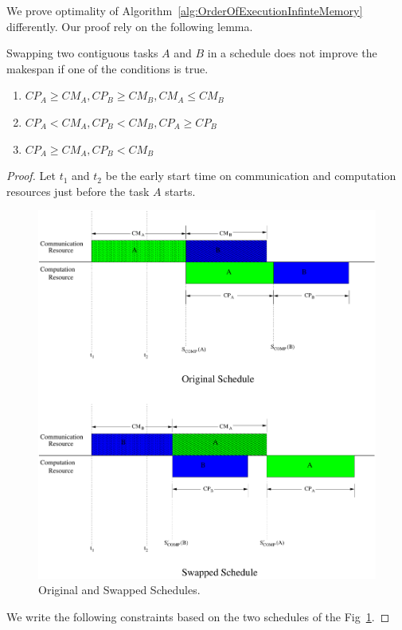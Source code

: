 \documentclass[runningheads]{llncs} %
\begin{document}
We  prove optimality of Algorithm~\ref{alg:OrderOfExecutionInfinteMemory}  differently. Our proof rely on the following lemma.

\begin{lemma}\label{lemma:swappingOfTasks}
	Swapping two contiguous tasks $A$ and $B$ in a schedule does not improve the makespan if one of the conditions is true.
	\begin{enumerate}[label=\roman*)]
		\item  $CP_A \ge CM_A, CP_B \ge CM_B, CM_A \le CM_B$
		\item $CP_A < CM_A, CP_B < CM_B, CP_A \ge CP_B$
		\item $CP_A \ge CM_A, CP_B < CM_B$
	\end{enumerate}
\end{lemma}
\begin{proof}
	Let $t_1$ and $t_2$ be the early start time on communication and computation resources just before the task $A$ starts.
	
	\begin{figure}[htb]
		\centering
		\includegraphics[scale=0.35]{./original_swapped_schedules-eps-converted-to.pdf}
		\caption{ \label{fig:bothSchedule} Original and Swapped Schedules.}
	\end{figure}
	We write the following constraints based on the two schedules of the Fig~\ref{fig:bothSchedule}.
	

\end{proof}
\end{document}
